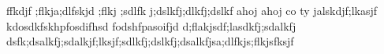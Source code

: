 ffkdjf ;flkja;dlfskjd ;flkj ;sdlfk j;dslkfj;dlkfj;dslkf ahoj ahoj co ty jalskdjf;lkasjf kdosdkfskhpfosdifhsd fodshfpasoifjd d;flakjsdf;lasdkfj;sdalkfj dsfk;dsalkfj;sdalkjf;lksjf;sdlkfj;dslkfj;dsalkfjsa;dlfkjs;flkjsfksjf